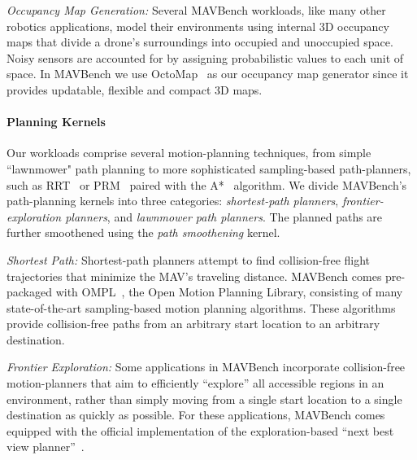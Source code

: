 \textit{Occupancy Map Generation:} Several MAVBench workloads, like many other robotics applications, model their environments using internal 3D occupancy maps that divide a drone's surroundings into occupied and unoccupied space. Noisy sensors are accounted for by assigning probabilistic values to each unit of space.
In MAVBench we use OctoMap~\cite{octomap} as our occupancy map generator since it provides updatable, flexible and compact 3D maps.

\paragraph{Planning Kernels} Our workloads comprise several motion-planning techniques, from simple ``lawnmower" path planning to more sophisticated sampling-based path-planners, such as RRT~\cite{rrt} or PRM~\cite{prm} paired with the A*~\cite{astar} algorithm. We divide MAVBench's path-planning kernels into three categories: \textit{shortest-path planners}, \textit{frontier-exploration planners}, and \textit{lawnmower path planners}. The planned paths are further smoothened using the \textit{path smoothening} kernel. 


\textit{Shortest Path:} Shortest-path planners attempt to find collision-free flight trajectories that minimize the MAV's traveling distance. MAVBench comes pre-packaged with OMPL~\cite{ompl}, the Open Motion Planning Library, consisting of many state-of-the-art sampling-based motion planning algorithms. These algorithms provide collision-free paths from an arbitrary start location to an arbitrary destination. %

\textit{Frontier Exploration:} 
Some applications in MAVBench incorporate collision-free motion-planners that aim to efficiently ``explore'' all accessible regions in an environment, rather than simply moving from a single start location to a single destination as quickly as possible.
For these applications, MAVBench comes equipped with the official implementation of the exploration-based ``next best view planner''~\cite{nbvplanner}.

